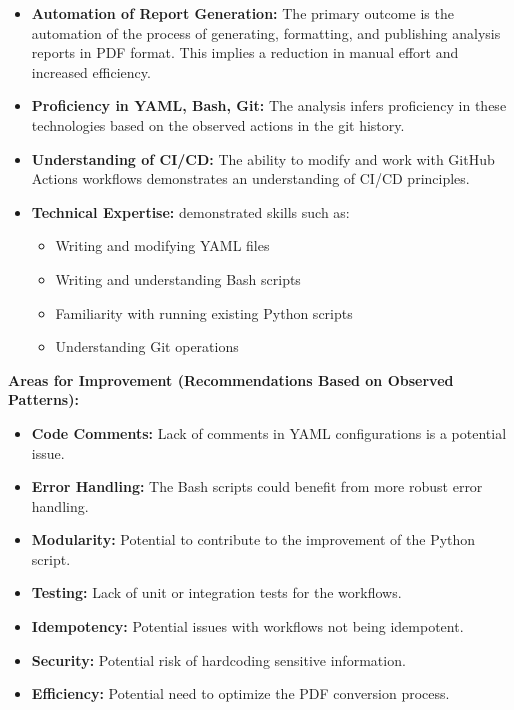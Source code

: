 \documentclass{article}
\begin{document}
\begin{itemize}
\begin{itemize}
        \begin{itemize}
            \item \textbf{Automation of Report Generation:}  The primary outcome is the automation of the process of generating, formatting, and publishing analysis reports in PDF format.  This implies a reduction in manual effort and increased efficiency.
            \item \textbf{Proficiency in YAML, Bash, Git:} The analysis infers proficiency in these technologies based on the observed actions in the git history.
            \item \textbf{Understanding of CI/CD:}  The ability to modify and work with GitHub Actions workflows demonstrates an understanding of CI/CD principles.
            \item \textbf{Technical Expertise:} demonstrated skills such as:
            \begin{itemize}
                \item Writing and modifying YAML files
                \item Writing and understanding Bash scripts
                \item Familiarity with running existing Python scripts
                \item Understanding Git operations
            \end{itemize}
        \end{itemize}

        \textbf{Areas for Improvement (Recommendations Based on Observed Patterns):}

        \begin{itemize}
            \item \textbf{Code Comments:} Lack of comments in YAML configurations is a potential issue.
            \item \textbf{Error Handling:} The Bash scripts could benefit from more robust error handling.
            \item \textbf{Modularity:}  Potential to contribute to the improvement of the Python script.
            \item \textbf{Testing:}  Lack of unit or integration tests for the workflows.
            \item \textbf{Idempotency:}  Potential issues with workflows not being idempotent.
            \item \textbf{Security:}  Potential risk of hardcoding sensitive information.
            \item \textbf{Efficiency:}  Potential need to optimize the PDF conversion process.
        \end{itemize}


\end{itemize}
\end{itemize}
\end{document}
